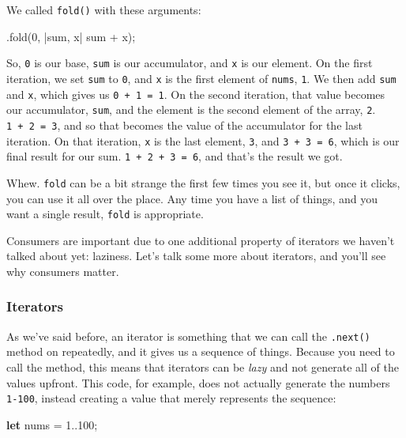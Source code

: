 \documentclass[a4paper,]{book}
\newenvironment{Shaded}{\begin{snugshade}}{\end{snugshade}}
\newcommand{\KeywordTok}[1]{\textcolor[rgb]{0.13,0.29,0.53}{\textbf{{#1}}}}
\newcommand{\DecValTok}[1]{\textcolor[rgb]{0.00,0.00,0.81}{{#1}}}
\newcommand{\NormalTok}[1]{{#1}}
\begin{document}
We called \texttt{fold()} with these arguments:

\begin{Shaded}
\begin{Highlighting}[]
\NormalTok{.fold(}\DecValTok{0}\NormalTok{, |sum, x| sum + x);}
\end{Highlighting}
\end{Shaded}

So, \texttt{0} is our base, \texttt{sum} is our accumulator, and
\texttt{x} is our element. On the first iteration, we set \texttt{sum}
to \texttt{0}, and \texttt{x} is the first element of \texttt{nums},
\texttt{1}. We then add \texttt{sum} and \texttt{x}, which gives us
\texttt{0\ +\ 1\ =\ 1}. On the second iteration, that value becomes our
accumulator, \texttt{sum}, and the element is the second element of the
array, \texttt{2}. \texttt{1\ +\ 2\ =\ 3}, and so that becomes the value
of the accumulator for the last iteration. On that iteration, \texttt{x}
is the last element, \texttt{3}, and \texttt{3\ +\ 3\ =\ 6}, which is
our final result for our sum. \texttt{1\ +\ 2\ +\ 3\ =\ 6}, and that's
the result we got.

Whew. \texttt{fold} can be a bit strange the first few times you see it,
but once it clicks, you can use it all over the place. Any time you have
a list of things, and you want a single result, \texttt{fold} is
appropriate.

Consumers are important due to one additional property of iterators we
haven't talked about yet: laziness. Let's talk some more about
iterators, and you'll see why consumers matter.

\subsubsection{Iterators}\label{iterators}

As we've said before, an iterator is something that we can call the
\texttt{.next()} method on repeatedly, and it gives us a sequence of
things. Because you need to call the method, this means that iterators
can be \emph{lazy} and not generate all of the values upfront. This
code, for example, does not actually generate the numbers
\texttt{1-100}, instead creating a value that merely represents the
sequence:

\begin{Shaded}
\begin{Highlighting}[]
\KeywordTok{let} \NormalTok{nums = }\DecValTok{1.}\NormalTok{.}\DecValTok{100}\NormalTok{;}
\end{Highlighting}
\end{Shaded}
\end{document}
